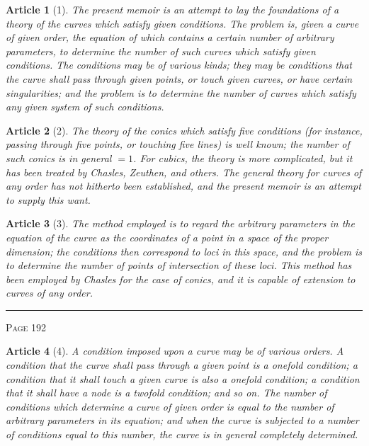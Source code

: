 \documentclass[11pt,a4paper]{article}
\theoremstyle{cayley}
\newtheorem{art}{Article}
\begin{document}
\vspace{1em}

\begin{art}[1]
The present memoir is an attempt to lay the foundations of a theory of the curves which satisfy given conditions. The problem is, given a curve of given order, the equation of which contains a certain number of arbitrary parameters, to determine the number of such curves which satisfy given conditions. The conditions may be of various kinds; they may be conditions that the curve shall pass through given points, or touch given curves, or have certain singularities; and the problem is to determine the number of curves which satisfy any given system of such conditions.
\end{art}

\begin{art}[2]
The theory of the conics which satisfy five conditions (for instance, passing through five points, or touching five lines) is well known; the number of such conics is in general $=1$. For cubics, the theory is more complicated, but it has been treated by Chasles, Zeuthen, and others. The general theory for curves of any order has not hitherto been established, and the present memoir is an attempt to supply this want.
\end{art}

\begin{art}[3]
The method employed is to regard the arbitrary parameters in the equation of the curve as the coordinates of a point in a space of the proper dimension; the conditions then correspond to loci in this space, and the problem is to determine the number of points of intersection of these loci. This method has been employed by Chasles for the case of conics, and it is capable of extension to curves of any order.
\end{art}

\vspace{1em}
\noindent\rule{\textwidth}{0.4pt}
\begin{center}\textsc{Page 192}\end{center}
\newpage

\begin{art}[4]
A condition imposed upon a curve may be of various orders. A condition that the curve shall pass through a given point is a onefold condition; a condition that it shall touch a given curve is also a onefold condition; a condition that it shall have a node is a twofold condition; and so on. The number of conditions which determine a curve of given order is equal to the number of arbitrary parameters in its equation; and when the curve is subjected to a number of conditions equal to this number, the curve is in general completely determined.
\end{art}
\end{document}
